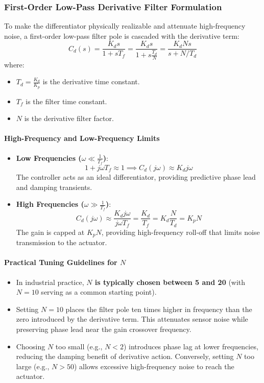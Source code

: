 \documentclass[12pt,onecolumn,twoside ]{article}
\begin{document}
	\subsubsection{First-Order Low-Pass Derivative Filter Formulation}
	To make the differentiator physically realizable and attenuate high-frequency noise, a first-order low-pass filter pole is cascaded with the derivative term: \[
	C_d(s) = \frac{K_d s}{1 + s T_f} = \frac{K_d s}{1 + s \frac{T_d}{N}} = \frac{K_d N s}{s + N/T_d}
	\] where:
	\begin{itemize}
		\item
		$T_d = \frac{K_d}{K_p}$ is the derivative time constant.
		\item
		$T_f$ is the filter time constant.
		\item
		$N$ is the derivative filter factor.
	\end{itemize}
	\paragraph{High-Frequency and Low-Frequency Limits}
	\begin{itemize}
		\item
		\textbf{Low Frequencies ($\omega \ll \frac{1}{T_f}$)}: \[
		1 + j\omega T_f \approx 1 \implies C_d(j\omega) \approx K_d j\omega
		\] The controller acts as an ideal differentiator, providing predictive phase lead and damping transients.
		\item
		\textbf{High Frequencies ($\omega \gg \frac{1}{T_f}$)}: \[
		C_d(j\omega) \approx \frac{K_d j\omega}{j\omega T_f} = \frac{K_d}{T_f} = K_d \frac{N}{T_d} = K_p N
		\] The gain is capped at $K_p N$, providing high-frequency roll-off that limits noise transmission to the actuator.
	\end{itemize}
	\paragraph{Practical Tuning Guidelines for $N$}
	\begin{itemize}
		\item
		In industrial practice, \textbf{$N$ is typically chosen between 5 and 20} (with $N = 10$ serving as a common starting point).
		\item
		Setting $N = 10$ places the filter pole ten times higher in frequency than the zero introduced by the derivative term. This attenuates sensor noise while preserving phase lead near the gain crossover frequency.
		\item
		Choosing $N$ too small (e.g., $N < 2$) introduces phase lag at lower frequencies, reducing the damping benefit of derivative action. Conversely, setting $N$ too large (e.g., $N > 50$) allows excessive high-frequency noise to reach the actuator.
	\end{itemize}
	
\end{document}
